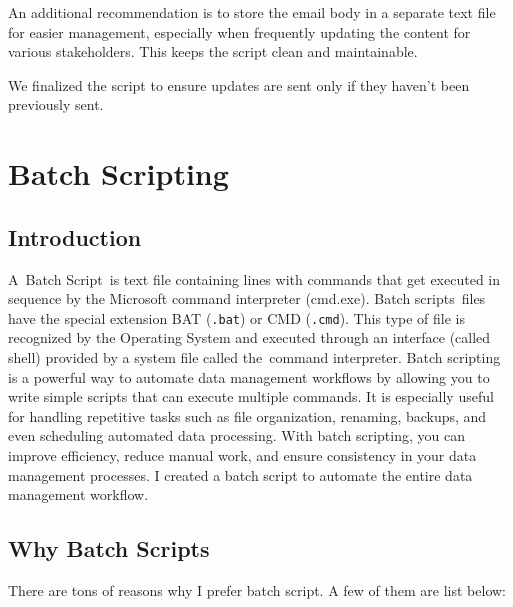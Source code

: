 \documentclass[
  letterpaper,
  DIV=11,
  numbers=noendperiod]{scrreprt}
\begin{document}
An additional recommendation is to store the email body in a separate
text file for easier management, especially when frequently updating the
content for various stakeholders. This keeps the script clean and
maintainable.

We finalized the script to ensure updates are sent only if they haven't
been previously sent.


\chapter{Batch Scripting}\label{batch-scripting}

\section{Introduction}\label{introduction-7}

A~Batch Script~is text file containing lines with commands that get
executed in sequence by the Microsoft command interpreter (cmd.exe).
Batch scripts~files have the special extension BAT (\texttt{.bat}) or
CMD (\texttt{.cmd}). This type of file is recognized by the Operating
System and executed through an interface (called shell) provided by a
system file called the~command interpreter. Batch scripting is a
powerful way to automate data management workflows by allowing you to
write simple scripts that can execute multiple commands. It is
especially useful for handling repetitive tasks such as file
organization, renaming, backups, and even scheduling automated data
processing. With batch scripting, you can improve efficiency, reduce
manual work, and ensure consistency in your data management processes. I
created a batch script to automate the entire data management workflow.

\section{Why Batch Scripts}\label{why-batch-scripts}

There are tons of reasons why I prefer batch script. A few of them are
list below:
\end{document}
